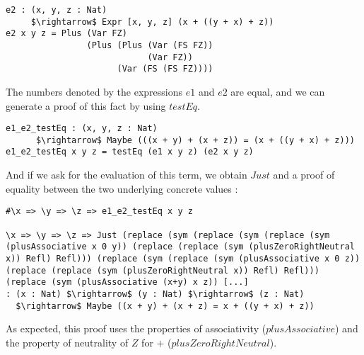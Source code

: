 \begin{lstlisting}
e2 : (x, y, z : Nat) 
     $\rightarrow$ Expr [x, y, z] (x + ((y + x) + z))
e2 x y z = Plus (Var FZ) 
                (Plus (Plus (Var (FS FZ)) 
                            (Var FZ)) 
                      (Var (FS (FS FZ))))
\end{lstlisting}


The numbers denoted by the expressions $e1$ and $e2$ are equal, and we can generate a proof of this fact by using $testEq$.


\begin{lstlisting}
e1_e2_testEq : (x, y, z : Nat) 
      $\rightarrow$ Maybe (((x + y) + (x + z)) = (x + ((y + x) + z)))
e1_e2_testEq x y z = testEq (e1 x y z) (e2 x y z)
\end{lstlisting}



And if we ask for the evaluation of this term, we obtain $Just$ and a proof of equality between the two underlying concrete values :


\begin{lstlisting}
#\x => \y => \z => e1_e2_testEq x y z

\x => \y => \z => Just (replace (sym (replace (sym (replace (sym 
(plusAssociative x 0 y)) (replace (replace (sym (plusZeroRightNeutral 
x)) Refl) Refl))) (replace (sym (replace (sym (plusAssociative x 0 z)) 
(replace (replace (sym (plusZeroRightNeutral x)) Refl) Refl))) 
(replace (sym (plusAssociative (x+y) x z)) [...]
: (x : Nat) $\rightarrow$ (y : Nat) $\rightarrow$ (z : Nat) 
  $\rightarrow$ Maybe ((x + y) + (x + z) = x + ((y + x) + z))
\end{lstlisting}

As expected, this proof uses the properties of associativity ($plusAssociative$) and the property of neutrality of $Z$ for $+$ ($plusZeroRightNeutral$).


